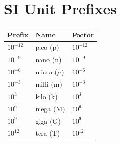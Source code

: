 \section{SI Unit Prefixes}
\begin{center}
\begin{tabular}{lll}
\toprule
\textbf{Prefix} & \textbf{Name} & \textbf{Factor} \\
\midrule
      $10^{-12}$ & pico (p)   & $10^{-12}$ \\
      $10^{-9}$ & nano (n)  & $10^{-9}$ \\
      $10^{-6}$ & micro ($\mu$) & $10^{-6}$ \\
      $10^{-3}$ & milli (m)  & $10^{-3}$ \\
      $10^{3}$  & kilo (k)   & $10^{3}$ \\
      $10^{6}$  & mega (M)   & $10^{6}$ \\
      $10^{9}$  & giga (G)   & $10^{9}$ \\
      $10^{12}$ & tera (T)   & $10^{12}$ \\
\bottomrule
\end{tabular}
\end{center}

\clearpage
